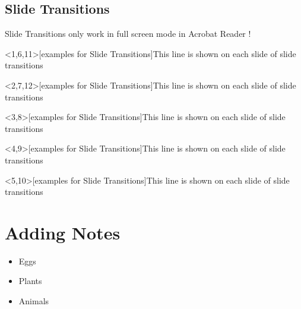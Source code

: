 \documentclass{beamer}
\begin{document}
\subsection{Slide Transitions}
\begin{frame}
  Slide Transitions only work in full screen mode in Acrobat Reader !
  \begin{example}<1,6,11>[examples for Slide Transitions]{This line is shown on each slide of slide transitions}\end{example}
  \begin{example}<2,7,12>[examples for Slide Transitions]{This line is shown on each slide of slide transitions}\end{example}
  \begin{example}<3,8>[examples for Slide Transitions]{This line is shown on each slide of slide transitions}\end{example}
  \begin{example}<4,9>[examples for Slide Transitions]{This line is shown on each slide of slide transitions}\end{example}
  \begin{example}<5,10>[examples for Slide Transitions]{This line is shown on each slide of slide transitions}\end{example}
\end{frame}

\section{Adding Notes}
\begin{frame}
  \begin{itemize}
  \item<1-> Eggs
  \item<2-> Plants
  \item<3-> Animals
  \end{itemize}
\end{frame}

%

\end{document}
